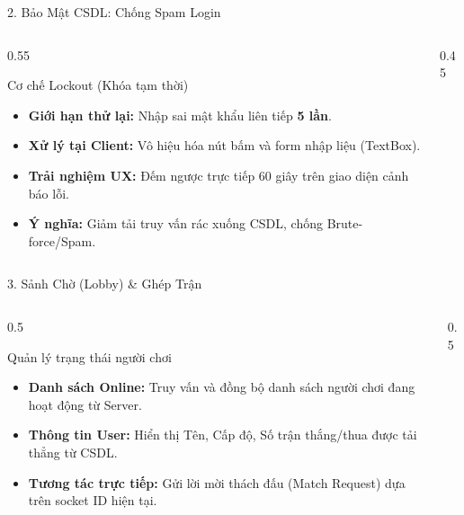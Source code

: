 \begin{frame}{2. Bảo Mật CSDL: Chống Spam Login}
\begin{columns}
\begin{column}{0.55\textwidth}
\begin{exampleblock}{Cơ chế Lockout (Khóa tạm thời)}
\begin{itemize}
\item \textbf{Giới hạn thử lại:} Nhập sai mật khẩu liên tiếp \textbf{5 lần}.
\item \textbf{Xử lý tại Client:} Vô hiệu hóa nút bấm và form nhập liệu (TextBox).
\item \textbf{Trải nghiệm UX:} Đếm ngược trực tiếp 60 giây trên giao diện cảnh báo lỗi.
\item \textbf{Ý nghĩa:} Giảm tải truy vấn rác xuống CSDL, chống Brute-force/Spam.
\end{itemize}
\end{exampleblock}
\end{column}
\begin{column}{0.45\textwidth}
\centering
{}
\end{column}
\end{columns}
\end{frame}

\begin{frame}{3. Sảnh Chờ (Lobby) & Ghép Trận}
\begin{columns}
\begin{column}{0.5\textwidth}
\begin{block}{Quản lý trạng thái người chơi}
\begin{itemize}
\item \textbf{Danh sách Online:} Truy vấn và đồng bộ danh sách người chơi đang hoạt động từ Server.
\item \textbf{Thông tin User:} Hiển thị Tên, Cấp độ, Số trận thắng/thua được tải thẳng từ CSDL.
\item \textbf{Tương tác trực tiếp:} Gửi lời mời thách đấu (Match Request) dựa trên socket ID hiện tại.
\end{itemize}
\end{block}
\end{column}
\begin{column}{0.5\textwidth}
\centering
{}
\end{column}
\end{columns}
\end{frame}

